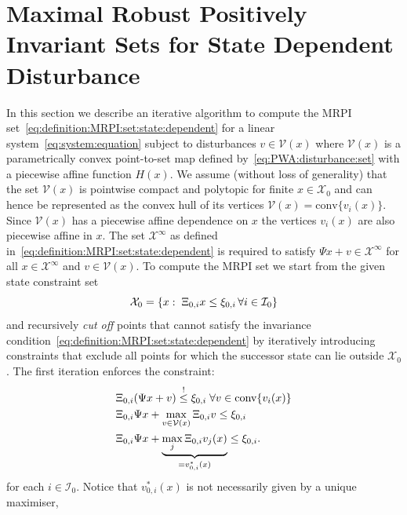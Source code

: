 \documentclass[letterpaper, 10pt, conference]{ieeeconf} %
\providecommand{\conv}{\text{conv}}
\begin{document}
\section{Maximal Robust Positively Invariant Sets for State Dependent Disturbance}\label{sec:state:dep:MRPI}
In this section we describe an iterative algorithm to compute the MRPI 
set~\eqref{eq:definition:MRPI:set:state:dependent} for a linear system~\eqref{eq:system:equation} subject to disturbances
$v\in\mathcal V(x)$ where $\mathcal V(x)$ is a parametrically convex point-to-set map defined by~\eqref{eq:PWA:disturbance:set} with a piecewise affine function $H(x)$.
We assume (without loss of generality) that the set $\mathcal V(x)$ is pointwise compact and polytopic 
for finite $x\in\mathcal X_0$ and can hence be represented as the 
convex hull of its vertices $\mathcal V(x) = \conv\{v_i(x)\}$. Since ${\mathcal{V}}(x)$
has a piecewise affine dependence on $x$ the vertices $v_i(x)$ are also piecewise affine in $x$.
The set $\mathcal X^\infty$ as defined in~\eqref{eq:definition:MRPI:set:state:dependent} 
is required to satisfy $\Psi x + v\in\mathcal X^\infty$ for all
$x\in\mathcal X^\infty$ and $v\in\mathcal V(x)$. To compute the MRPI set we start from the given 
state constraint set
\[
\mathcal X_0 = \{x:\;\Xi_{0,i}x\leq \xi_{0,i}\,\forall i\in\mathcal I_0\}
\]
and
recursively \emph{cut off} points that cannot satisfy the invariance condition~\eqref{eq:definition:MRPI:set:state:dependent}
by iteratively introducing
constraints that exclude all points for which the successor state can lie outside 
$\mathcal X_0$. The first iteration enforces the constraint:
%
\[%
\begin{split}
	&\genmat_{0,i}(\Psi x + v)\overset{!}{\leq}\genvec_{0,i}\;\forall v\in\conv\{v_i(x)\}\\
	&\genmat_{0,i}\Psi x + \max_{v\in\mathcal V(x)} \genmat_{0,i} v \leq \genvec_{0,i}\\
	&\genmat_{0,i}\Psi x + \underbrace{\max_{j} \genmat_{0,i} v_j(x)}_{=v_{0,i}^\ast(x)} \leq \genvec_{0,i}.
\end{split}
\]%
%
for each $i\in \mathcal I_0$.
Notice that $v_{0,i}^\ast(x)$ is not necessarily given by a unique maximiser, 
\end{document}
